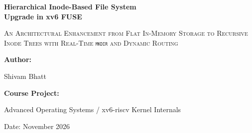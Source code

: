 \documentclass[11pt,a4paper]{article}
\begin{document}
\begin{titlepage}
    \centering
    \vspace*{1.5cm}
    
    {\Huge \bfseries Hierarchical Inode-Based File System\\ Upgrade in xv6 FUSE\par}
    \vspace{0.8cm}
    {\Large \scshape An Architectural Enhancement from Flat In-Memory Storage to Recursive Inode Trees with Real-Time \texttt{mkdir} and Dynamic Routing\par}
    
    \vspace{2.5cm}
    
    \textbf{\Large Author:}\\
    \vspace{0.2cm}
    {\large Shivam Bhatt\par}
    \vspace{1.5cm}
    
    \textbf{\Large Course Project:}\\
    {\large Advanced Operating Systems / xv6-riscv Kernel Internals\par}
    \vspace{0.5cm}
    {\large Date: November 2026\par}
    
    \vfill
    
    \begin{abstract}
    Standard FUSE (Filesystem in Userspace) implementations decouple filesystem implementation logic from the monolithic kernel space, delegating path lookups, block management, and attribute querying to a user-space daemon. The baseline xv6 FUSE project offered a rudimentary IPC bridge between the kernel and a daemon, but was fundamentally constrained to a single-level, flat namespace (\texttt{/fuse/*}) restricted to 16 files, lacking directory structures and rejecting \texttt{mkdir}. This work introduces a complete architectural upgrade: we design and implement a hierarchical, in-memory inode filesystem engine in user space backed by an 8-slot concurrent circular IPC queue in the kernel. System calls (\texttt{sys\_mkdir}, \texttt{sys\_open}, \texttt{sys\_unlink}) are dynamically intercepted and routed across the \texttt{/dev/fuse} character device abstraction before reaching disk transactions. Experimental results verify arbitrary directory nesting, correct parent-child directory link tracking (\texttt{.} and \texttt{..}), recursive path tokenization, and deadlock-free execution under 4-way concurrent process stress.
    \end{abstract}
    
    \vspace{1cm}
\end{titlepage}
\end{document}

